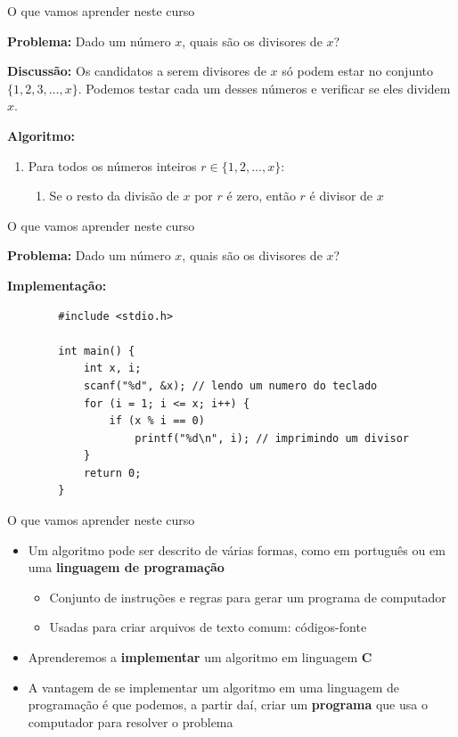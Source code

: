 \documentclass[handout]{beamer}
\begin{document}
\begin{frame}[fragile]{O que vamos aprender neste curso}

    \textbf{Problema:} Dado um número $x$, quais são os divisores de $x$?

    \pause
    \textbf{Discussão:} Os candidatos a serem divisores de $x$ só podem estar no conjunto $\{1,2,3,\ldots,x\}$.
    Podemos testar cada um desses números e verificar se eles dividem $x$.

    \pause
    \textbf{Algoritmo:}
    \begin{enumerate}
        \item Para todos os números inteiros $r \in \{1,2,\ldots,x\}$:
        \begin{enumerate}
            \item Se o resto da divisão de $x$ por $r$ é zero, então $r$ é divisor de $x$
        \end{enumerate}
    \end{enumerate}
\end{frame}

\begin{frame}[fragile]{O que vamos aprender neste curso}

    \textbf{Problema:} Dado um número $x$, quais são os divisores de $x$?

    \textbf{Implementação:}
    \begin{verbatim}
        #include <stdio.h>

        int main() {
            int x, i;
            scanf("%d", &x); // lendo um numero do teclado
            for (i = 1; i <= x; i++) {
                if (x % i == 0)
                    printf("%d\n", i); // imprimindo um divisor
            }
            return 0;
        }
    \end{verbatim}
\end{frame}

\begin{frame}{O que vamos aprender neste curso}

    \begin{itemize}[<+->]
        \item Um algoritmo pode ser descrito de várias formas, como em português ou em uma \textbf{linguagem de programação}
        \begin{itemize}
            \item Conjunto de instruções e regras para gerar um programa de computador
            \item Usadas para criar arquivos de texto comum: códigos-fonte
        \end{itemize}
        \item Aprenderemos a {\bf implementar} um algoritmo em linguagem \textbf{C}
        \item A vantagem de se implementar um algoritmo em uma linguagem de programação é que podemos, a partir daí, criar um \textbf{programa} que usa o computador para resolver o problema
    \end{itemize}
\end{frame}
\end{document}
